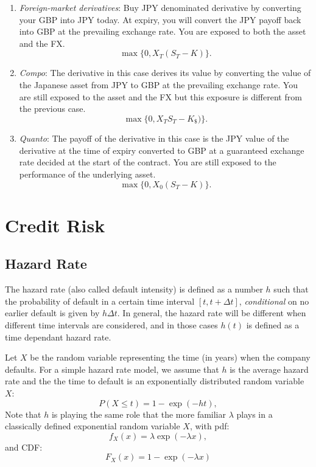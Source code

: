 \documentclass{amsart}
\theoremstyle{plain}
\numberwithin{equation}{section}
\begin{document}
\begin{enumerate}
\item \emph{Foreign-market derivatives}:
Buy JPY denominated derivative by converting 
your GBP into JPY today. At expiry, 
you will convert the JPY payoff back
into GBP at the prevailing exchange rate.
You are exposed to both the asset and 
the FX.
\begin{equation}
\max\{0, X_T(S_T - K)\}.
\end{equation}
\item \emph{Compo}:
The derivative in this case
derives its value by converting the value 
of the Japanese asset from JPY to 
GBP at the prevailing exchange 
rate. You are still exposed to the 
asset and the FX but this exposure 
is different from the previous case.
\begin{equation}
\max\{0, X_T S_T - K_{\$})\}.
\end{equation}


\item \emph{Quanto}: The payoff of the 
derivative in this case is the
JPY value of the derivative at the 
time of expiry
converted to GBP at a guaranteed
exchange rate decided at the start 
of the contract. You are still exposed
to the performance of the underlying asset.
\begin{equation}
\max\{0, X_0(S_T - K)\}.
\end{equation}

\end{enumerate}


\section{Credit Risk}
\subsection{Hazard Rate}
The hazard rate (also called default intensity) is defined 
as a number $h$ such that the probability of default in a certain time interval $[t, t+\Delta t]$, \emph{conditional} on no earlier default is given by $h\Delta t$. In general, the hazard rate will be different when different time intervals
are considered, and in those cases $h(t)$ is defined
as a time dependant hazard rate.

Let $X$ be the random variable representing the time (in years)
when the company defaults. For a simple hazard rate model, 
we assume that $h$ is the average hazard rate and the 
the time to default is an exponentially distributed 
random variable $X$:
$$P( X \leq t ) = 1 - \exp( -h t ),$$
Note that $h$ is playing the same role that 
the more familiar $\lambda$ plays in a classically
defined exponential random variable $X$, with pdf:
$$f_X(x) = \lambda \exp(-\lambda x),$$
and CDF:
$$F_X(x) = 1-\exp(-\lambda x)$$
\end{document}
